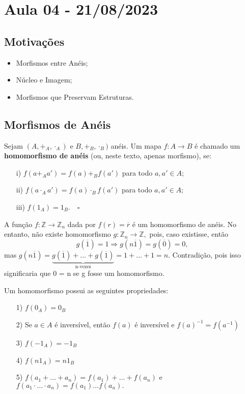 \documentclass[AlgebraII/algebraII_notes.tex]{subfiles}
\begin{document}
\section{Aula 04 - 21/08/2023}
\subsection{Motivações}
\begin{itemize}
	\item Morfismos entre Anéis;
	\item Núcleo e Imagem;
	\item Morfismos que Preservam Estruturas.
\end{itemize}
\subsection{Morfismos de Anéis}
\begin{def*}
	Sejam \((A, +_{A}, \cdot_{A})\) e \(B, +_{B}, \cdot_{B})\) anéis. Um mapa \(f:A\rightarrow B\) é chamado um \textbf{homomorfismo de anéis}
	(ou, neste texto, apenas morfismo), se:
	\begin{itemize}
		\item[i)] \(f(a +_{A} a') = f(a) +_{B} f(a')\) para todo \(a, a'\in A;\)
		\item[ii)] \(f(a \cdot_{A} a') = f(a)\cdot_{B}f(a')\) para todo \(a, a'\in A;\)
		\item[iii)] \(f(1_{A}) = 1_{B}.\quad\square\)
	\end{itemize}
\end{def*}
\begin{example}
	A função \(f:\mathbb{Z}\rightarrow \mathbb{Z}_{n}\) dada por \(f(r) = \overline{r}\) é um homomorfismo de anéis. No entanto, não existe homomorfismo
	\(g:\mathbb{Z}_{n}\rightarrow \mathbb{Z},\) pois, caso existisse, então
	\[
		g(\overline{1}) = 1 \Rightarrow g(n\overline{1}) = g(\overline{0}) = 0,
	\]
	mas \(g(n\overline{1}) = \underbrace{g(\overline{1}) + \dotsc + g(\overline{1})}_{\text{n-vezes}} = 1 + \dotsc + 1 = n\). Contradição, pois isso
	significaria que 0 = n se g fosse um homomorfismo.
\end{example}
\begin{lemma*}
	Um homomorfismo possui as seguintes propriedades:
	\begin{itemize}
		\item[1)] \(f(0_{A}) = 0_{B}\)
		\item[2)] Se \(a\in A\) é inversível, então \(f(a)\) é inversível e \(f(a)^{-1} = f(a^{-1})\)
		\item[3)] \(f(-1_{A}) = -1_{B}\)
		\item[4)] \(f(n1_{A}) = n1_{B}\)
		\item[5)] \(f(a_{1} + \dotsc + a_{n}) = f(a_{1})+\dotsc +f(a_{n})\) e \(f(a_{1}\cdot \dotsc \cdot a_{n}) = f(a_{1})\dotsc f(a_{n}).\)
	\end{itemize}
\end{lemma*}
\end{document}
